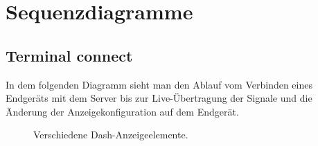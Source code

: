 \documentclass[entwurf.tex]{subfiles}
\begin{document}
\chapter{Sequenzdiagramme}
	\section{Terminal connect}
		In dem folgenden Diagramm sieht man den Ablauf vom Verbinden eines Endgeräts mit dem Server bis zur Live-Übertragung der Signale und die Änderung der Anzeigekonfiguration auf dem Endgerät. 
		\begin{figure}[H]
  			\caption{Verschiedene Dash-Anzeigeelemente.}
  		\end{figure}
  		
\end{document}
